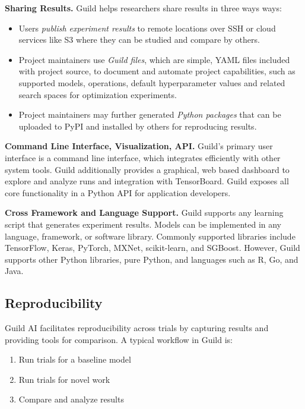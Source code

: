 \documentclass{article}
\begin{document}
\textbf{Sharing Results.} Guild helps researchers share results in
three ways ways:

\begin{itemize}[topsep=3pt]
\item Users \emph{publish experiment results} to remote locations over
  SSH or cloud services like S3 where they can be studied and compare
  by others.
\item Project maintainers use \emph{Guild files}, which are simple,
  YAML files included with project source, to document and automate
  project capabilities, such as supported models, operations, default
  hyperparameter values and related search spaces for optimization
  experiments.
\item Project maintainers may further generated \emph{Python packages}
  that can be uploaded to PyPI and installed by others for reproducing
  results.
\end{itemize}

\textbf{Command Line Interface, Visualization, API.} Guild's primary
user interface is a command line interface, which integrates
efficiently with other system tools. Guild additionally provides a
graphical, web based dashboard to explore and analyze runs and
integration with TensorBoard. Guild exposes all core functionality in
a Python API for application developers.

\textbf{Cross Framework and Language Support.} Guild supports any
learning script that generates experiment results. Models can be
implemented in any language, framework, or software library. Commonly
supported libraries include TensorFlow, Keras, PyTorch, MXNet,
scikit-learn, and SGBoost. However, Guild supports other Python
libraries, pure Python, and languages such as R, Go, and Java.

\subsection{Reproducibility}

Guild AI facilitates reproducibility across trials by capturing
results and providing tools for comparison. A typical workflow in
Guild is:

\begin{enumerate}[noitemsep, topsep=0pt, partopsep=0pt]
\item Run trials for a baseline model
\item Run trials for novel work
\item Compare and analyze results
\end{enumerate}
\end{document}
